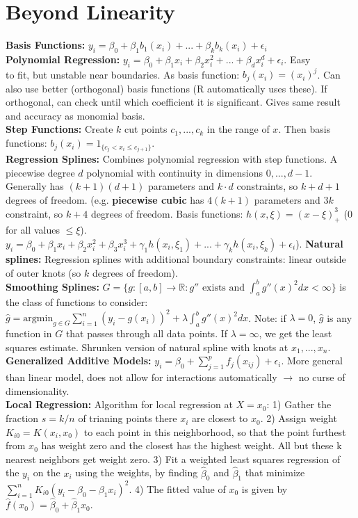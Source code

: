 \section*{Beyond Linearity}
\textbf{Basis Functions:} $y_i = \beta_0 + \beta_1 b_1(x_i) + ... + \beta_k b_k(x_i) + \epsilon_i$ \\
\textbf{Polynomial Regression:} $y_i=\beta_0+\beta_1 x_i + \beta_2 x_i^2 +...+\beta_d x_i^d + \epsilon_i$. Easy \\
\vfill
to fit, but unstable near boundaries. As basis function: $b_j(x_i) = (x_i)^j$. Can also use better (orthogonal) basis functions (R automatically uses these). If orthogonal, can check until which coefficient it is significant. Gives same result and accuracy as monomial basis.\\
\textbf{Step Functions:} 
Create $k$ cut points $c_1,...,c_k$ in the range of $x$. Then basis functions: $b_j(x_i) = \mathds{}{1}_{\{ c_j < x_i \leq c_{j+1}\}}$. \\
\textbf{Regression Splines:} 
Combines polynomial regression with step functions. A piecewise degree $d$ polynomial with continuity in dimensions $0, ..., d-1$. Generally has $(k+1)(d+1)$ parameters and $k\cdot d$ constraints, so $k+d+1$ degrees of freedom. (e.g. \textbf{piecewise cubic} has $4(k+1)$ parameters and $3k$ constraint, so $k+4$ degrees of freedom. Basis functions: $h(x, \xi)=(x-\xi)_+^3$ ($0$ for all values $\leq \xi$). $y_i = \beta_0 + \beta_1 x_i + \beta_2 x_i^2 + \beta_3 x_i^3 + \gamma_1 h(x_i, \xi_1) + ... + \gamma_k h(x_i, \xi_k) + \epsilon_i$). \textbf{Natural splines:} Regression splines with additional boundary constraints: linear outside of outer knots (so $k$ degrees of freedom). \\
\textbf{Smoothing Splines:} $G=\{ g:[a,b]\to \mathbb{R}: g'' \text{ exists and } \int_a^b g''(x)^2 dx < \infty \}$ is the class of functions to consider: $\hat g = \text{argmin}_{g\in G} \sum_{i=1}^n (y_i - g(x_i))^2 + \lambda \int_a^b g''(x)^2 dx$. Note: if $\lambda = 0$, $\hat g$ is any function in $G$ that passes through all data points. If $\lambda=\infty$, we get the least squares estimate. Shrunken version of natural spline with knots at $x_1, ..., x_n$. \\
\textbf{Generalized Additive Models:} $y_i = \beta_0 + \sum_{j=1}^p f_j(x_{ij}) + \epsilon_i$. More general than linear model, does not allow for interactions automatically $\to$ no curse of dimensionality. \\
\textbf{Local Regression:} Algorithm for local regression at $X=x_0$: 1) Gather the fraction $s=k/n$ of trianing points there $x_i$ are closest to $x_0$. 2) Assign weight $K_{i0}=K(x_i, x_0)$ to each point in this neighborhood, so that the point furthest from $x_0$ has weight zero and the closest has the highest weight. All but these k nearest neighbors get weight zero. 3) Fit a weighted least squares regression of the $y_i$ on the $x_i$ using the weights, by finding $\hat\beta_0$ and $\hat\beta_1$ that minimize $\sum_{i=1}^n K_{i0}(y_i-\beta_0-\beta_1 x_i)^2$. 4) The fitted value of $x_0$ is given by $\hat f (x_0) = \hat\beta_0 + \hat\beta_1 x_0$.

